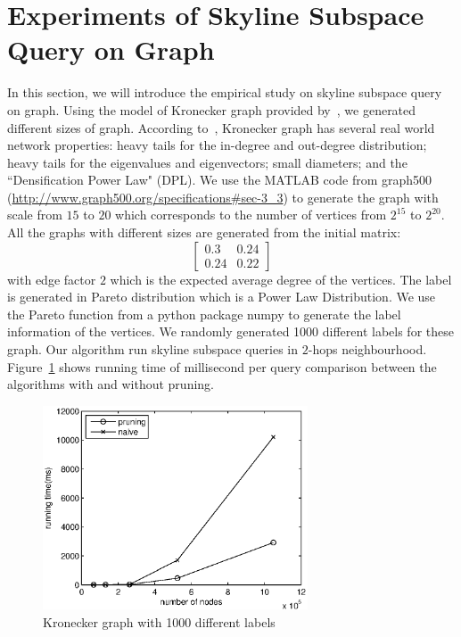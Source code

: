 \section{Experiments of Skyline Subspace Query on Graph}
\label{ch:exp:graph}
In this section, we will introduce the empirical study on skyline subspace query on graph.
Using the model of Kronecker graph provided by~\cite{leskovec2005realistic}, we generated different sizes of graph.
According to~\cite{leskovec2005realistic}, Kronecker graph has several real world network properties:
heavy tails for the in-degree and out-degree distribution;
heavy tails for the eigenvalues and eigenvectors;
small diameters; and the ``Densification Power Law" (DPL).
We use the MATLAB code from graph500 (\url{http://www.graph500.org/specifications#sec-3_3}) to generate the graph with scale from $15$ to $20$ which corresponds to the number of vertices from $2^{15}$ to $2^{20}$. All the graphs with different sizes are generated from the initial matrix:
\begin{equation}
\begin{bmatrix}
0.3 & 0.24\\ 
0.24 & 0.22
\end{bmatrix}
\end{equation}
with edge factor $2$ which is the expected average degree of the vertices. The label is generated in Pareto distribution which is a Power Law Distribution. We use the Pareto function from a python package numpy to generate the label information of the vertices. We randomly generated 1000 different labels for these graph. Our algorithm run skyline subspace queries in $2$-hops neighbourhood. Figure~\ref{fig:exp:kronecker} shows running time of millisecond per query comparison between the algorithms with and without pruning.

\begin{figure}[h]
    \centering
      \includegraphics[width=0.7\textwidth]{figs/kronecker}
    \caption{Kronecker graph with 1000 different labels}
    \label{fig:exp:kronecker}
\end{figure}

